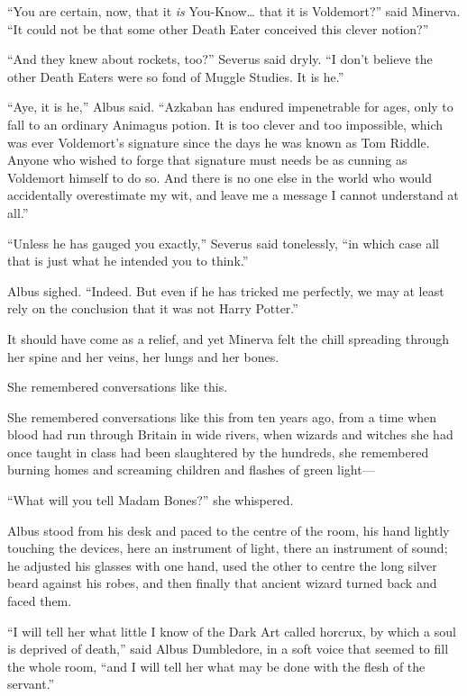``You are certain, now, that it \emph{is} You-Know\ldots{} that it is
Voldemort?'' said Minerva. ``It could not be that some other Death Eater
conceived this clever notion?''

``And they knew about rockets, too?'' Severus said dryly. ``I don't
believe the other Death Eaters were so fond of Muggle Studies. It is
he.''

``Aye, it is he,'' Albus said. ``Azkaban has endured impenetrable for
ages, only to fall to an ordinary Animagus potion. It is too clever and
too impossible, which was ever Voldemort's signature since the days he
was known as Tom Riddle. Anyone who wished to forge that signature must
needs be as cunning as Voldemort himself to do so. And there is no one
else in the world who would accidentally overestimate my wit, and leave
me a message I cannot understand at all.''

``Unless he has gauged you exactly,'' Severus said tonelessly, ``in
which case all that is just what he intended you to think.''

Albus sighed. ``Indeed. But even if he has tricked me perfectly, we may
at least rely on the conclusion that it was not Harry Potter.''

It should have come as a relief, and yet Minerva felt the chill
spreading through her spine and her veins, her lungs and her bones.

She remembered conversations like this.

She remembered conversations like this from ten years ago, from a time
when blood had run through Britain in wide rivers, when wizards and
witches she had once taught in class had been slaughtered by the
hundreds, she remembered burning homes and screaming children and
flashes of green light---

``What will you tell Madam Bones?'' she whispered.

Albus stood from his desk and paced to the centre of the room, his hand
lightly touching the devices, here an instrument of light, there an
instrument of sound; he adjusted his glasses with one hand, used the
other to centre the long silver beard against his robes, and then
finally that ancient wizard turned back and faced them.

``I will tell her what little I know of the Dark Art called horcrux, by
which a soul is deprived of death,'' said Albus Dumbledore, in a soft
voice that seemed to fill the whole room, ``and I will tell her what may
be done with the flesh of the servant.''

